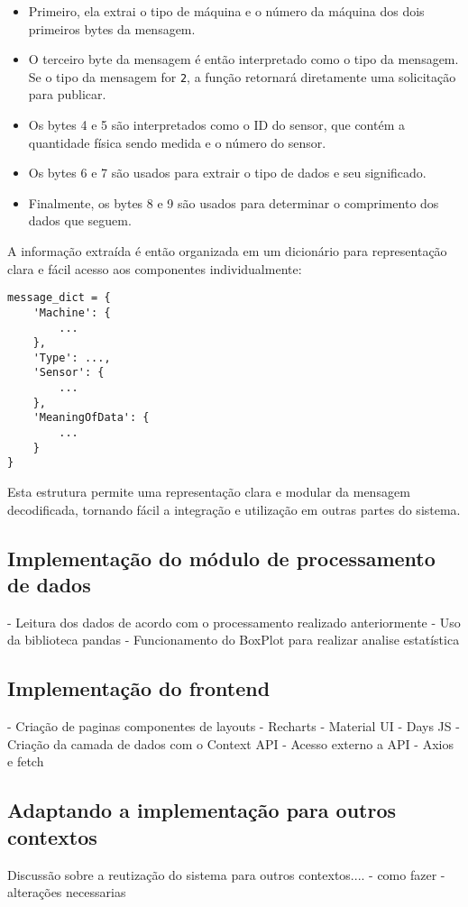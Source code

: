 \begin{itemize}
    \item Primeiro, ela extrai o tipo de máquina e o número da máquina dos dois primeiros bytes da mensagem.
    
    \item O terceiro byte da mensagem é então interpretado como o tipo da mensagem. Se o tipo da mensagem for \texttt{2}, a função retornará diretamente uma solicitação para publicar.
    
    \item Os bytes 4 e 5 são interpretados como o ID do sensor, que contém a quantidade física sendo medida e o número do sensor.
    
    \item Os bytes 6 e 7 são usados para extrair o tipo de dados e seu significado.
    
    \item Finalmente, os bytes 8 e 9 são usados para determinar o comprimento dos dados que seguem.
\end{itemize}

A informação extraída é então organizada em um dicionário para representação clara e fácil acesso aos componentes individualmente:

\begin{verbatim}
message_dict = {
    'Machine': {
        ...
    },
    'Type': ...,
    'Sensor': {
        ...
    },
    'MeaningOfData': {
        ...
    }
}
\end{verbatim}

Esta estrutura permite uma representação clara e modular da mensagem decodificada, tornando fácil a integração e utilização em outras partes do sistema.



\subsection[Implementação do módulo de processamento de dados]{Implementação do módulo de processamento de dados}
- Leitura dos dados de acordo com o processamento realizado anteriormente
- Uso da biblioteca pandas
- Funcionamento do BoxPlot para realizar analise estatística

\subsection[Implementação do frontend]{Implementação do frontend}
- Criação de paginas componentes de layouts
- Recharts
- Material UI
- Days JS
- Criação da camada de dados com o Context API
- Acesso externo a API
- Axios e fetch

\subsection[Adaptando a implementação para outros contextos]{Adaptando a implementação para outros contextos}
Discussão sobre a reutização do sistema para outros contextos....
- como fazer
- alterações necessarias
